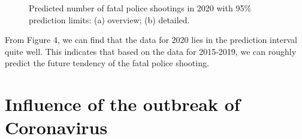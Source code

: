 \documentclass[a4paper]{article}
\begin{document}
	\begin{figure}[H]
    \centering
	\caption{Predicted number of fatal police shootings in 2020 with 95\% prediction limits: (a) overview; (b) detailed.}
    \end{figure}
    
    From Figure 4, we can find that the data for 2020 lies in the prediction interval quite well. This indicates that based on the data for 2015-2019, we can roughly predict the future tendency of the fatal police shooting.























\section{Influence of the outbreak of Coronavirus}
\end{document}
